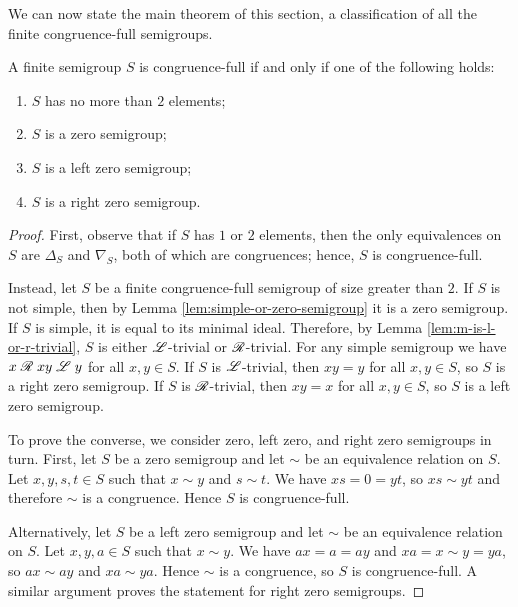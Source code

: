 We can now state the main theorem of this section, a classification of all the
finite congruence-full semigroups.

\begin{theorem}
  \label{thm:congruence-full}
  A finite semigroup $S$ is congruence-full if and only if one of the following
  holds:
  \begin{enumerate}[\rm(1)]
  \item $S$ has no more than $2$ elements;
  \item $S$ is a zero semigroup;
  \item $S$ is a left zero semigroup;
  \item $S$ is a right zero semigroup.
  \end{enumerate}
  \begin{proof}
    First, observe that if $S$ has $1$ or $2$ elements, then the only
    equivalences on $S$ are $\Delta_S$ and $\nabla_S$, both of which are
    congruences; hence, $S$ is congruence-full.

    Instead, let $S$ be a finite congruence-full semigroup of size greater than
    $2$.  If $S$ is not simple, then by Lemma \ref{lem:simple-or-zero-semigroup}
    it is a zero semigroup.  If $S$ is simple, it is equal to its minimal ideal.
    Therefore, by Lemma \ref{lem:m-is-l-or-r-trivial}, $S$ is either
    $\mathrel{\mathscr{L}}$-trivial or $\mathrel{\mathscr{R}}$-trivial.  For any simple semigroup we have
    $x \mathrel{\mathscr{R}} xy \mathrel{\mathscr{L}} y$ for all $x,y \in S$.  If $S$ is $\mathrel{\mathscr{L}}$-trivial, then $xy=y$
    for all $x,y \in S$, so $S$ is a right zero semigroup.  If $S$ is
    $\mathrel{\mathscr{R}}$-trivial, then $xy=x$ for all $x,y \in S$, so $S$ is a left zero
    semigroup.

    To prove the converse, we consider zero, left zero, and right zero
    semigroups in turn.  First, let $S$ be a zero semigroup and let $\sim$ be an
    equivalence relation on $S$.  Let $x,y,s,t \in S$ such that $x \sim y$ and
    $s \sim t$.  We have $xs = 0 = yt$, so $xs \sim yt$ and therefore $\sim$ is
    a congruence.  Hence $S$ is congruence-full.

    Alternatively, let $S$ be a left zero semigroup and let $\sim$ be an
    equivalence relation on $S$.  Let $x,y,a \in S$ such that $x \sim y$.  We
    have $ax = a = ay$ and $xa = x \sim y = ya$, so $ax \sim ay$ and
    $xa \sim ya$.  Hence $\sim$ is a congruence, so $S$ is congruence-full.
    A similar argument proves the statement for right zero semigroups.
  \end{proof}
\end{theorem}


